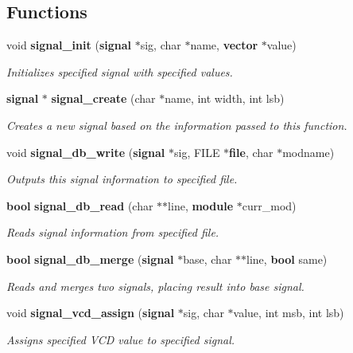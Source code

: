 \subsection*{Functions}
\begin{CompactItemize}
\item 
void {\bf signal\_\-init} ({\bf signal} $\ast$sig, char $\ast$name, {\bf vector} $\ast$value)
\begin{CompactList}\small\item\em Initializes specified signal with specified values.\item\end{CompactList}\item 
{\bf signal} $\ast$ {\bf signal\_\-create} (char $\ast$name, int width, int lsb)
\begin{CompactList}\small\item\em Creates a new signal based on the information passed to this function.\item\end{CompactList}\item 
void {\bf signal\_\-db\_\-write} ({\bf signal} $\ast$sig, FILE $\ast${\bf file}, char $\ast$modname)
\begin{CompactList}\small\item\em Outputs this signal information to specified file.\item\end{CompactList}\item 
{\bf bool} {\bf signal\_\-db\_\-read} (char $\ast$$\ast$line, {\bf module} $\ast$curr\_\-mod)
\begin{CompactList}\small\item\em Reads signal information from specified file.\item\end{CompactList}\item 
{\bf bool} {\bf signal\_\-db\_\-merge} ({\bf signal} $\ast$base, char $\ast$$\ast$line, {\bf bool} same)
\begin{CompactList}\small\item\em Reads and merges two signals, placing result into base signal.\item\end{CompactList}\item 
void {\bf signal\_\-vcd\_\-assign} ({\bf signal} $\ast$sig, char $\ast$value, int msb, int lsb)
\begin{CompactList}\small\item\em Assigns specified VCD value to specified signal.\item\end{CompactList}\item 

\end{CompactItemize}
